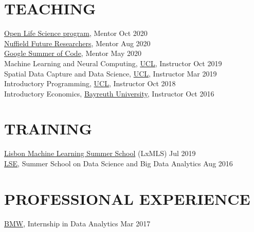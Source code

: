 \documentclass{cv}
\begin{document}
\section{TEACHING}

\href{https://openlifesci.org}{Open Life Science program}, Mentor \hfill Oct 2020 \\

\href{https://www.nuffieldfoundation.org/students-teachers/nuffield-future-researchers}{Nuffield Future Researchers}, Mentor \hfill Aug 2020 \\

\href{https://summerofcode.withgoogle.com/archive/2020/projects/6262209727954944/}{Google Summer of Code}, Mentor \hfill May 2020 \\

Machine Learning and Neural Computing, \href{https://www.ucl.ac.uk/}{UCL}, Instructor \hfill Oct 2019 \\

Spatial Data Capture and Data Science, \href{https://www.ucl.ac.uk/}{UCL}, Instructor \hfill Mar 2019 \\

Introductory Programming, \href{https://www.ucl.ac.uk/}{UCL}, Instructor \hfill Oct 2018 \\

Introductory Economics, \href{https://www.uni-bayreuth.de/en/}{Bayreuth University}, Instructor \hfill Oct 2016 \\

\section{TRAINING}

\href{http://lxmls.it.pt/}{Lisbon Machine Learning Summer School} (LxMLS) \hfill Jul 2019 \\

\href{https://www.lse.ac.uk}{LSE}, Summer School on Data Science and Big Data Analytics \hfill Aug 2016 

\section{PROFESSIONAL EXPERIENCE}

\href{https://www.bmw.com/en/index.html}{BMW}, Internship in Data Analytics  \hfill Mar 2017 \\
\end{document}
